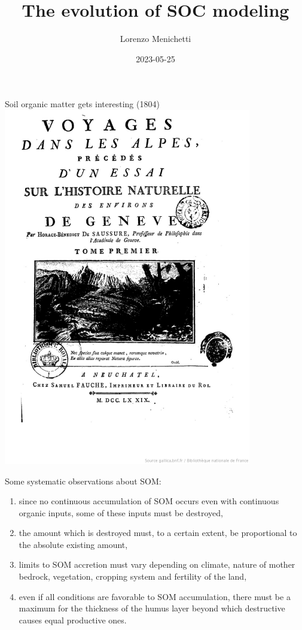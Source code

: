 \documentclass[
  ignorenonframetext,
]{beamer}
\title{The evolution of SOC modeling}
\author{Lorenzo Menichetti}
\date{2023-05-25}
\providecommand{\tightlist}{%
  \setlength{\itemsep}{0pt}\setlength{\parskip}{0pt}}
\begin{document}
\frame{\titlepage}

\begin{frame}{Soil organic matter gets interesting (1804)}
\protect\hypertarget{soil-organic-matter-gets-interesting-1804}{}
\includegraphics[width=\textwidth,height=0.5\textheight]{Saussure.png}

Some systematic observations about SOM:

\begin{enumerate}
\tightlist
\item
  since no continuous accumulation of SOM occurs even with continuous
  organic inputs, some of these inputs must be destroyed,
\item
  the amount which is destroyed must, to a certain extent, be
  proportional to the absolute existing amount,
\item
  limits to SOM accretion must vary depending on climate, nature of
  mother bedrock, vegetation, cropping system and fertility of the land,
\item
  even if all conditions are favorable to SOM accumulation, there must
  be a maximum for the thickness of the humus layer beyond which
  destructive causes equal productive ones.
\end{enumerate}
\end{frame}
\end{document}
